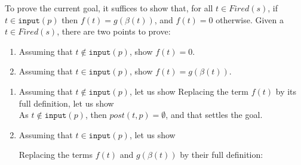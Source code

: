 \begin{itemize}
  To prove the current goal, it suffices to show that, for all
  $t\in{}Fired(s)$, if $t\in{}\mathtt{input}(p)$ then
  $f(t)=g(\beta(t))$, and $f(t)=0$ otherwise. Given a
  $t\in{}Fired(s)$, there are two points to prove: 
  \begin{enumerate}
  \item Assuming that $t\notin{}\mathtt{input}(p)$, show $f(t)=0$.
  \item Assuming that $t\in{}\mathtt{input}(p)$, show $f(t)=g(\beta(t))$.
  \end{enumerate}

  \bigskip
  
  \begin{enumerate}
  \item Assuming that $t\notin{}\mathtt{input}(p)$, let us show
     Replacing the term $f(t)$ by its full definition,
    let us show
    \\

     \noindent{}As $t\notin{}\mathtt{input}(p)$, then
     $post(t,p)=\emptyset$, and that settles the goal.
    
  \item Assuming that $t\in{}\mathtt{input}(p)$, let us show

    \noindent{}Replacing the terms $f(t)$ and $g(\beta(t))$ by their
    full definition:

    \\


\end{enumerate}
\end{itemize}
